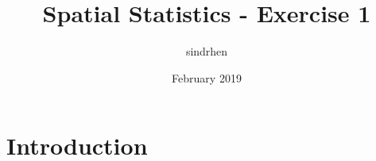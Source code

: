 \documentclass{article}
\title{Spatial Statistics - Exercise 1}
\author{sindrhen }
\date{February 2019}
\begin{document}
\maketitle

\section{Introduction}
\end{document}
